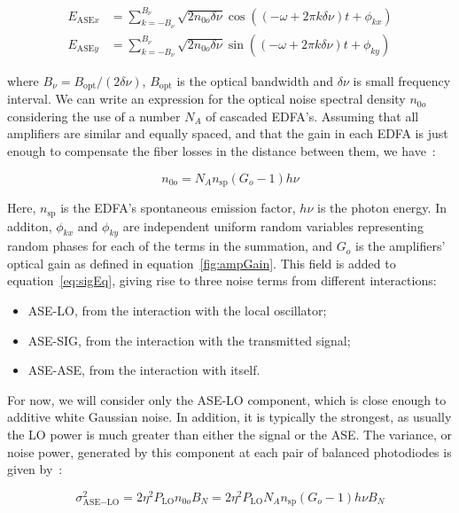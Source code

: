 	\begin{align}
		E_{\text{ASE}x} &= \sum_{k=-B_\nu}^{B_\nu} \sqrt{2 n_{0o} \delta \nu}
		\cos{((-\omega + 2\pi k \delta \nu) t + \phi_{kx})} \\
		E_{\text{ASE}y} &= \sum_{k=-B_\nu}^{B_\nu} \sqrt{2 n_{0o} \delta \nu}
		\sin{((-\omega + 2\pi k \delta \nu) t + \phi_{ky})}
	\end{align}

	\noindent where $B_\nu = B_{\text{opt}}/(2 \delta \nu)$, $B_{\text{opt}}$ is the optical
	bandwidth and $\delta \nu$ is small frequency interval. We can write an
	expression for the optical noise spectral density $n_{0o}$ considering the use of a number
	$N_A$ of cascaded EDFA's. Assuming that all amplifiers are similar and equally
	spaced, and that the gain in each EDFA is just enough to compensate the fiber
	losses in the distance between them, we have~\cite{agrawal12}:

	\begin{equation}
		n_{0o} = N_A n_{\text{sp}} (G_o-1) h\nu
	\end{equation}

	Here, $n_{\text{sp}}$ is the EDFA's spontaneous emission factor, $h\nu$ is the
	photon energy.
	In additon, $\phi_{kx}$ and $\phi_{ky}$ are independent uniform random
	variables representing random phases for each of the terms in the summation,
	and $G_o$ is the amplifiers'  optical gain as defined in
	equation~\ref{fig:ampGain}.
	This field is added to equation~\ref{eq:sigEq}, giving rise to three noise
	terms from different interactions:

	\begin{itemize}
		\item ASE-LO, from the interaction with the local oscillator;
		\item ASE-SIG, from the interaction with the transmitted signal;
		\item ASE-ASE, from the interaction with itself.
	\end{itemize}

	For now, we will consider only the ASE-LO component, which  is close enough
	to additive white Gaussian noise. In addition, it is typically the strongest,
	as usually the LO power is much greater than either the signal or the ASE. The
	variance, or noise power, generated by this component at each pair of balanced
	photodiodes is given by~\cite{crognale14}:

	\begin{equation}\label{eq:noiseComps}
		\sigma_{\text{ASE}-\text{LO}}^2 = 2 \eta^2 P_{\text{LO}} n_{0o} B_N =
		2 \eta^2 P_{\text{LO}} N_A n_{\text{sp}} (G_o - 1) h\nu B_N
	\end{equation}

